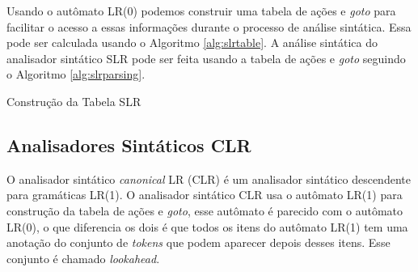 Usando o autômato LR(0) podemos construir uma tabela de ações e \textit{goto} para facilitar o acesso a essas informações durante o processo de análise sintática. Essa pode ser calculada usando o Algoritmo \ref{alg:slrtable}. A análise sintática do analisador sintático SLR pode ser feita usando a tabela de ações e \textit{goto} seguindo o Algoritmo \ref{alg:slrparsing}.

\begin{algorithm}[ht]
    \caption{Construção da Tabela SLR}\label{alg:slrtable}
\end{algorithm}

\subsection{Analisadores Sintáticos CLR}
O analisador sintático \textit{canonical} LR (CLR) é um analisador sintático descendente para gramáticas LR(1). O analisador sintático CLR usa o autômato LR(1) para construção da tabela de ações e \textit{goto}, esse autômato é parecido com o autômato LR(0), o que diferencia os dois é que todos os itens do autômato LR(1) tem uma anotação do conjunto de \textit{tokens} que podem aparecer depois desses itens. Esse conjunto é chamado \textit{lookahead}.

